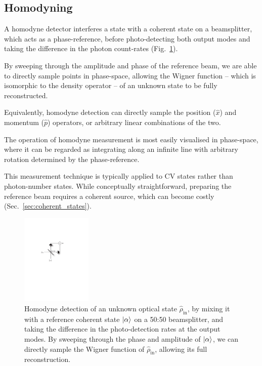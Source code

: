 %
%

\subsection{Homodyning} \label{sec:homodyne} 

A homodyne detector interferes a state with a coherent state on a beamsplitter, which acts as a phase-reference, before photo-detecting both output modes and taking the difference in the photon count-rates (Fig.~\ref{fig:homodyne}).

By sweeping through the amplitude and phase of the reference beam, we are able to directly sample points in phase-space, allowing the Wigner function -- which is isomorphic to the density operator -- of an unknown state to be fully reconstructed.

Equivalently, homodyne detection can directly sample the position ($\hat x$) and momentum ($\hat p$) operators, or arbitrary linear combinations of the two. 

The operation of homodyne measurement is most easily visualised in phase-space, where it can be regarded as integrating along an infinite line with arbitrary rotation determined by the phase-reference.

This measurement technique is typically applied to CV states rather than photon-number states. While conceptually straightforward, preparing the reference beam requires a coherent source, which can become costly (Sec.~\ref{sec:coherent_states}).

\begin{figure}[!htbp]
\includegraphics[clip=true, width=0.3\textwidth]{homodyne}
\captionspacefig \caption{Homodyne detection of an unknown optical state $\hat\rho_\mathrm{in}$, by mixing it with a reference coherent state $|\alpha\rangle$ on a 50:50 beamsplitter, and taking the difference in the photo-detection rates at the output modes. By sweeping through the phase and amplitude of $|\alpha\rangle$, we can directly sample the Wigner function of $\hat\rho_\mathrm{in}$, allowing its full reconstruction.} \label{fig:homodyne}
\end{figure}

